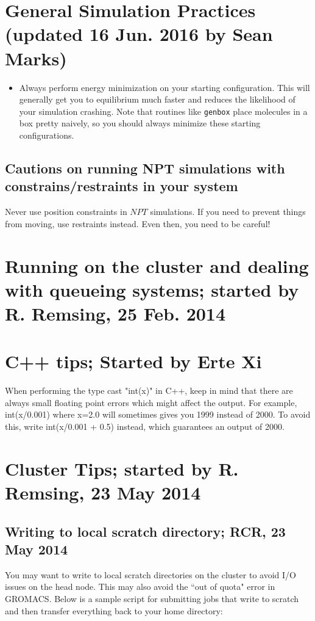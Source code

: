 \documentclass[aip,jmp,superscriptaddress,reprint,onecolumn]{revtex4-1}
\begin{document}
\section{General Simulation Practices (updated 16 Jun. 2016 by Sean Marks)}
\begin{itemize}
	\item Always perform energy minimization on your starting configuration. This will generally get you to equilibrium much faster and reduces the likelihood of your simulation crashing. Note that routines like \texttt{genbox} place molecules in a box pretty naively, so you should always minimize these starting configurations.
\end{itemize}

\subsection{Cautions on running NPT simulations with constrains/restraints in your system}
Never use position constraints in $NPT$ simulations. If you need to prevent things from moving, use restraints instead. Even then, you need to be careful!

\section{Running on the cluster and dealing with queueing systems; started by R. Remsing, 25 Feb. 2014}

\section{C++ tips; Started by Erte Xi}

When performing the type cast "int(x)" in C++, keep in mind that there are always  small floating point errors which might affect the output.
For example, int(x/0.001) where x=2.0 will sometimes gives you 1999 instead of 2000.
To avoid this, write int(x/0.001 + 0.5) instead, which guarantees an output of 2000. 


\section{Cluster Tips; started by R. Remsing, 23 May 2014}
\subsection{Writing to local scratch directory; RCR, 23 May 2014}
You may want to write to local scratch directories on the cluster to avoid I/O issues on the head node. This may also avoid the ``out of quota" error in GROMACS.
Below is a sample script for submitting jobs that write to scratch and then transfer everything back to your home directory:
\\
\end{document}
